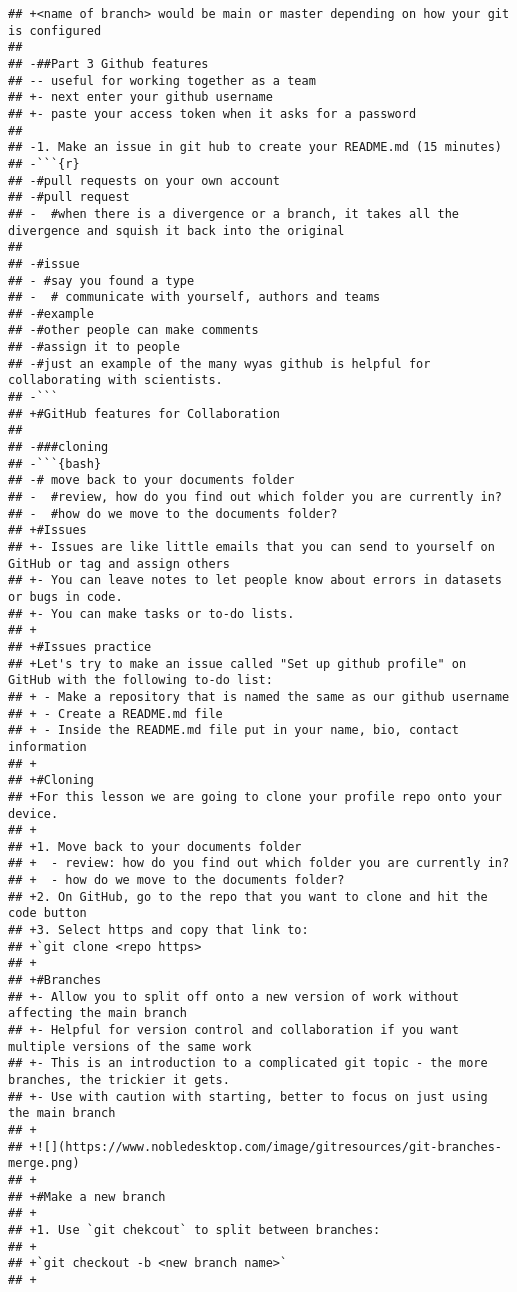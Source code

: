 \documentclass[]{article}
\begin{document}
\begin{verbatim}
## +<name of branch> would be main or master depending on how your git is configured
##  
## -##Part 3 Github features
## -- useful for working together as a team
## +- next enter your github username
## +- paste your access token when it asks for a password
##  
## -1. Make an issue in git hub to create your README.md (15 minutes)
## -```{r}
## -#pull requests on your own account 
## -#pull request 
## -  #when there is a divergence or a branch, it takes all the divergence and squish it back into the original
##  
## -#issue
## - #say you found a type
## -  # communicate with yourself, authors and teams 
## -#example
## -#other people can make comments
## -#assign it to people
## -#just an example of the many wyas github is helpful for collaborating with scientists.
## -```
## +#GitHub features for Collaboration
##  
## -###cloning
## -```{bash}
## -# move back to your documents folder
## -  #review, how do you find out which folder you are currently in? 
## -  #how do we move to the documents folder? 
## +#Issues
## +- Issues are like little emails that you can send to yourself on GitHub or tag and assign others
## +- You can leave notes to let people know about errors in datasets or bugs in code. 
## +- You can make tasks or to-do lists. 
## +
## +#Issues practice 
## +Let's try to make an issue called "Set up github profile" on GitHub with the following to-do list: 
## + - Make a repository that is named the same as our github username
## + - Create a README.md file
## + - Inside the README.md file put in your name, bio, contact information
## +
## +#Cloning
## +For this lesson we are going to clone your profile repo onto your device. 
## +
## +1. Move back to your documents folder 
## +  - review: how do you find out which folder you are currently in? 
## +  - how do we move to the documents folder? 
## +2. On GitHub, go to the repo that you want to clone and hit the code button
## +3. Select https and copy that link to: 
## +`git clone <repo https>
## +
## +#Branches
## +- Allow you to split off onto a new version of work without affecting the main branch 
## +- Helpful for version control and collaboration if you want multiple versions of the same work
## +- This is an introduction to a complicated git topic - the more branches, the trickier it gets. 
## +- Use with caution with starting, better to focus on just using the main branch
## +
## +![](https://www.nobledesktop.com/image/gitresources/git-branches-merge.png)
## +
## +#Make a new branch
## +
## +1. Use `git chekcout` to split between branches:
## +
## +`git checkout -b <new branch name>`
## +

\end{verbatim}
\end{document}
